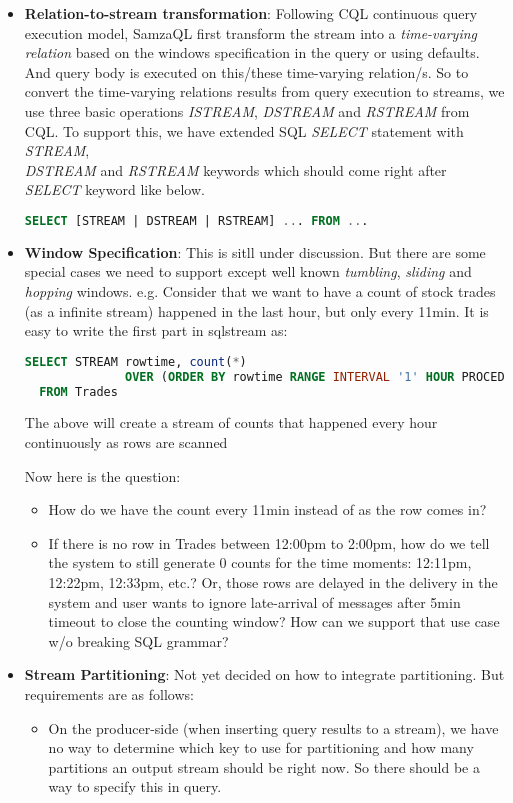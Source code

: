 \documentclass[10pt, conference, compsocconf]{IEEEtran}
\begin{document}
\begin{itemize}
\item \textbf{Relation-to-stream transformation}: Following CQL \cite{arasu2006cql} continuous query execution model, SamzaQL first transform the stream into a \textit{time-varying relation} based on the windows specification in the query or using defaults. And query body is executed on this/these time-varying relation/s. So to convert the time-varying relations results from query execution to streams, we use three basic operations  \textit{ISTREAM}, \textit{DSTREAM} and \textit{RSTREAM} from CQL. To support this, we have extended SQL \textit{SELECT} statement with \textit{STREAM},\\ \textit{DSTREAM} and \textit{RSTREAM} keywords which should come right after \textit{SELECT} keyword like below.

\begin{lstlisting}[language=SQL]
SELECT [STREAM | DSTREAM | RSTREAM] ... FROM ...
\end{lstlisting}

\item \textbf{Window Specification}: This is sitll under discussion. But there are some special cases we need to support except well known \textit{tumbling}, \textit{sliding} and \textit{hopping} windows. e.g. Consider that we want to have a count of stock trades (as a infinite stream) happened in the last hour, but only every 11min. It is easy to write the first part in sqlstream as:

\begin{lstlisting}[language=SQL]
SELECT STREAM rowtime, count(*) 
              OVER (ORDER BY rowtime RANGE INTERVAL '1' HOUR PROCEDING)
  FROM Trades
\end{lstlisting}
The above will create a stream of counts that happened every hour continuously as rows are scanned

Now here is the question:
\begin{itemize}
\item How do we have the count every 11min instead of as the row comes in?
\item If there is no row in Trades between 12:00pm to 2:00pm, how do we tell the system to still generate 0 counts for the time moments: 12:11pm, 12:22pm, 12:33pm, etc.? Or, those rows are delayed in the delivery in the system and user wants to ignore late-arrival of messages after 5min timeout to close the counting window? How can we support that use case w/o breaking SQL grammar?
\end{itemize}

\item \textbf{Stream Partitioning}: Not yet decided on how to integrate partitioning. But requirements are as follows:
\begin{itemize}
\item On the producer-side (when inserting query results to a stream), we have no way to determine which key to use for partitioning and how many partitions an output stream should be right now. So there should be a way to specify this in query.
\end{itemize}

\end{itemize}
\end{document}
